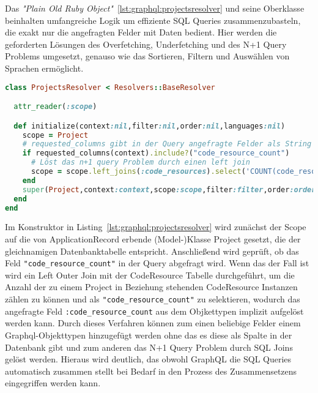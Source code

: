 Das \emph{"Plain Old Ruby Object"}~\ref{lst:graphql:projectsresolver} und seine Oberklasse beinhalten umfangreiche Logik um effiziente SQL Queries zusammenzubasteln, die exakt nur die angefragten Felder mit Daten bedient. Hier werden die geforderten Lösungen des Overfetching, Underfetching und des N+1 Query Problems umgesetzt, genauso wie das Sortieren, Filtern und Auswählen von Sprachen ermöglicht.

\begin{lstlisting}[language=Ruby,float=h!,caption={\emph{"Plain Old Ruby Object"} zum Auflösung der Query \lstinline|:projects|. \lstinline|/graphql/resolvers/projects_resolver.rb|}, label={lst:graphql:projectsresolver}]
class ProjectsResolver < Resolvers::BaseResolver

  attr_reader(:scope)

  def initialize(context:nil,filter:nil,order:nil,languages:nil)
    scope = Project
    # requested_columns gibt in der Query angefragte Felder als String Array zurück
    if requested_columns(context).include?("code_resource_count")
      # Löst das n+1 query Problem durch einen left join
      scope = scope.left_joins(:code_resources).select('COUNT(code_resources) AS code_resource_count').group('projects.id')
    end
    super(Project,context:context,scope:scope,filter:filter,order:order,languages:languages,order_dir: "asc",order_field:"name")
  end
end
\end{lstlisting}

Im Konstruktor in Listing~\ref{lst:graphql:projectsresolver} wird zunächst der Scope auf die von ApplicationRecord erbende (Model-)Klasse Project gesetzt, die der gleichnamigen Datenbanktabelle entspricht. Anschließend wird geprüft, ob das Feld \lstinline|"code_resource_count"| in der Query abgefragt wird. Wenn das der Fall ist wird ein Left Outer Join mit der CodeResource Tabelle durchgeführt, um die Anzahl der zu einem Project in Beziehung stehenden CodeResource Instanzen zählen zu können und als \lstinline|"code_resource_count"| zu selektieren, wodurch das angefragte Feld \lstinline|:code_resource_count| aus dem Objkettypen  implizit aufgelöst werden kann. Durch dieses Verfahren können zum einen beliebige Felder einem Graphql-Objekttypen hinzugefügt werden ohne das es diese als Spalte in der Datenbank gibt und zum anderen das N+1 Query Problem durch SQL Joins gelöst werden. 
Hieraus wird deutlich, das obwohl GraphQL die SQL Queries automatisch zusammen stellt bei Bedarf in den Prozess des Zusammensetzens eingegriffen werden kann.

